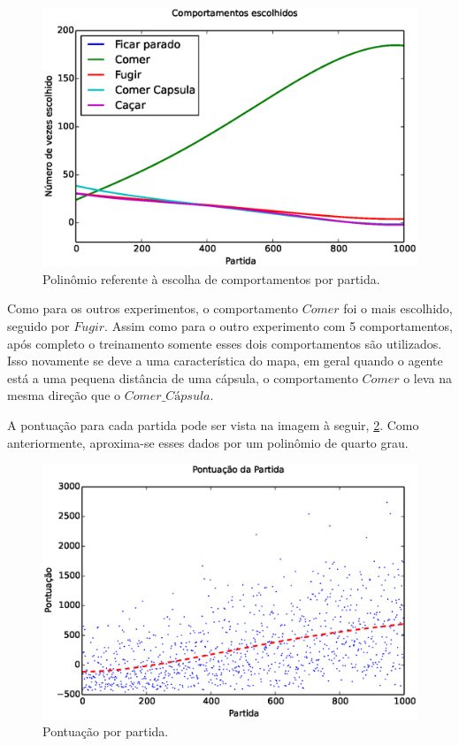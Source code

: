 \begin{figure}[H]
    \centering
    \includegraphics[width=\linewidth]{images/5_behaviors_original_map/chosen_behaviors_pol}
    \caption{Polinômio referente à escolha de comportamentos por partida.}
    \label{img:5ComportamentosMapaOriginal:ComportamentosEscolhidosPolinômio}
\end{figure}

Como para os outros experimentos, o comportamento $ Comer $ foi o mais escolhido, seguido por $ Fugir $. Assim como para o outro experimento com 5 comportamentos, após completo o treinamento somente esses dois comportamentos são utilizados. Isso novamente se deve a uma característica do mapa, em geral quando o agente está a uma pequena distância de uma cápsula, o comportamento $ Comer $ o leva na mesma direção que o $ \textit{Comer\_Cápsula} $.

A pontuação para cada partida pode ser vista na imagem à seguir, \ref{img:5ComportamentosMapaOriginal:PontuacaoPorPartida}. Como anteriormente, aproxima-se esses dados por um polinômio de quarto grau.

\begin{figure}[h]
    \centering
    \includegraphics[width=\linewidth]{images/5_behaviors_original_map/match_scores____pol}
    \caption{Pontuação por partida.}
    \label{img:5ComportamentosMapaOriginal:PontuacaoPorPartida}
\end{figure}

